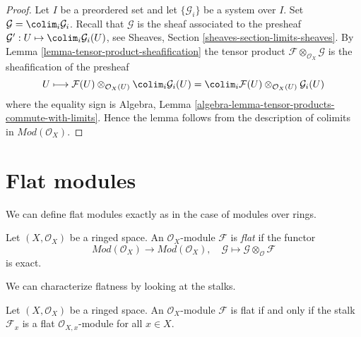 \begin{proof}
Let $I$ be a preordered set and let $\{\mathcal{G}_i\}$ be
a system over $I$. Set $\mathcal{G} = \colim_i \mathcal{G}_i$.
Recall that $\mathcal{G}$ is the sheaf associated to the presheaf
$\mathcal{G}' : U \mapsto \colim_i \mathcal{G}_i(U)$, see
Sheaves, Section \ref{sheaves-section-limits-sheaves}.
By
Lemma \ref{lemma-tensor-product-sheafification}
the tensor product $\mathcal{F} \otimes_{\mathcal{O}_X} \mathcal{G}$
is the sheafification of the presheaf
$$
U \longmapsto
\mathcal{F}(U) \otimes_{\mathcal{O}_X(U)} \colim_i \mathcal{G}_i(U) =
\colim_i \mathcal{F}(U) \otimes_{\mathcal{O}_X(U)} \mathcal{G}_i(U)
$$
where the equality sign is
Algebra, Lemma \ref{algebra-lemma-tensor-products-commute-with-limits}.
Hence the lemma follows from the description of colimits in
$\textit{Mod}(\mathcal{O}_X)$.
\end{proof}





\section{Flat modules}
\label{section-flat}

\noindent
We can define flat modules exactly as in the case of modules over rings.

\begin{definition}
\label{definition-flat}
Let $(X, \mathcal{O}_X)$ be a ringed space.
An $\mathcal{O}_X$-module $\mathcal{F}$ is {\it flat} if the functor
$$
\textit{Mod}(\mathcal{O}_X)
\longrightarrow
\textit{Mod}(\mathcal{O}_X), \quad
\mathcal{G} \mapsto \mathcal{G} \otimes_\mathcal{O} \mathcal{F}
$$
is exact.
\end{definition}

\noindent
We can characterize flatness by looking at the stalks.

\begin{lemma}
\label{lemma-flat-stalks-flat}
Let $(X, \mathcal{O}_X)$ be a ringed space.
An $\mathcal{O}_X$-module $\mathcal{F}$ is flat
if and only if the stalk $\mathcal{F}_x$ is a flat
$\mathcal{O}_{X, x}$-module for all $x \in X$.
\end{lemma}

